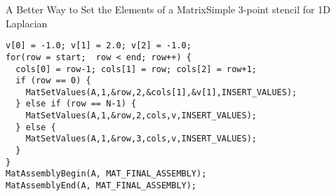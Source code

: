 \begin{frame}[fragile]{A Better Way to Set the Elements of a Matrix}{Simple 3-point stencil for 1D Laplacian}
\small
\begin{verbatim}
v[0] = -1.0; v[1] = 2.0; v[2] = -1.0;
for(row = start;  row < end; row++) {
  cols[0] = row-1; cols[1] = row; cols[2] = row+1;
  if (row == 0) {
    MatSetValues(A,1,&row,2,&cols[1],&v[1],INSERT_VALUES);
  } else if (row == N-1) {
    MatSetValues(A,1,&row,2,cols,v,INSERT_VALUES);
  } else {
    MatSetValues(A,1,&row,3,cols,v,INSERT_VALUES);
  }
}
MatAssemblyBegin(A, MAT_FINAL_ASSEMBLY);
MatAssemblyEnd(A, MAT_FINAL_ASSEMBLY);
\end{verbatim}
\end{frame}
